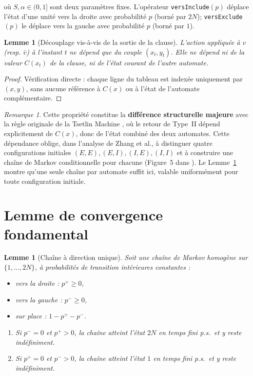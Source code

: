 \documentclass[12pt,a4paper]{article}
\newtheorem{lemma}[theorem]{Lemme}
\theoremstyle{remark}
\newtheorem{remark}{Remarque}[section]
\newcommand{\vbar}{\bar{v}}
\begin{document}
où $S, \alpha \in (0,1]$ sont deux paramètres fixes. L'opérateur \texttt{versInclude}$(p)$
déplace l'état d'une unité vers la droite avec probabilité $p$ (borné par $2N$);
\texttt{versExclude}$(p)$ le déplace vers la gauche avec probabilité $p$ (borné par $1$).

\begin{lemma}[Découplage vis-à-vis de la sortie de la clause]\label{lem:decoupling}
L'action appliquée à $v$ (resp. $\vbar$) à l'instant $t$ ne dépend que du couple
$(x_t, y_t)$. Elle ne dépend \emph{ni} de la valeur $C(x_t)$ de la clause, \emph{ni}
de l'état courant de l'autre automate.
\end{lemma}

\begin{proof}
Vérification directe : chaque ligne du tableau est indexée uniquement par $(x,y)$,
sans aucune référence à $C(x)$ ou à l'état de l'automate complémentaire.
\end{proof}

\begin{remark}\label{rem:difference_tm}
Cette propriété constitue la \textbf{différence structurelle majeure} avec la règle
originale de la Tsetlin Machine \cite{granmo2018,zhang2021}, où le retour de Type~II
dépend explicitement de $C(x)$, donc de l'état combiné des deux automates.  Cette
dépendance oblige, dans l'analyse de Zhang et al., à distinguer quatre configurations
initiales $(E,E),(E,I),(I,E),(I,I)$ et à construire une chaîne de Markov conditionnelle
pour chacune (Figure~5 dans \cite{zhang2021}).  Le Lemme~\ref{lem:decoupling} montre
qu'une seule chaîne par automate suffit ici, valable uniformément pour toute configuration
initiale.
\end{remark}

\section{Lemme de convergence fondamental}

\begin{lemma}[Chaîne à direction unique]\label{lem:convergence}
Soit une chaîne de Markov homogène sur $\{1,\ldots,2N\}$, à probabilités de transition
intérieures constantes :
\begin{itemize}
  \item vers la droite : $p^+ \ge 0$,
  \item vers la gauche : $p^- \ge 0$,
  \item sur place : $1 - p^+ - p^-$.
\end{itemize}
\begin{enumerate}
  \item[\textup{(a)}] Si $p^- = 0$ et $p^+ > 0$, la chaîne atteint l'état $2N$ en temps fini p.s.\ et y reste indéfiniment.
  \item[\textup{(b)}] Si $p^+ = 0$ et $p^- > 0$, la chaîne atteint l'état $1$ en temps fini p.s.\ et y reste indéfiniment.
\end{enumerate}
\end{lemma}
\end{document}
